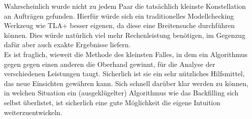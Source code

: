 
Wahrscheinlich wurde nicht zu jedem Paar die tatsächlich kleinste Konstellation an Aufträgen gefunden. Hierfür würde sich ein traditionelles Modellchecking Werkzeug wie TLA+ besser eigenen, da diese eine Breitensuche durchführen können. Dies würde natürlich viel mehr Rechenleistung benötigen, im Gegenzug dafür aber auch exakte Ergebnisse liefern.\\
Es ist fraglich, wieweit die Methode des kleinsten Falles, in dem ein Algorithmus gegen gegen einen anderen die Oberhand gewinnt, für die Analyse der verschiedenen Leistungen taugt. Sicherlich ist sie ein sehr nützliches Hilfsmittel, das neue Einsichten gewähren kann. Sich schnell darüber klar werden zu können, in welchen Situation ein (ausgeklügelter) Algorithmus wie das Backfilling sich selbst überlistet, ist sicherlich eine gute Möglichkeit die eigene Intuition weiterzuentwickeln.
\FloatBarrier